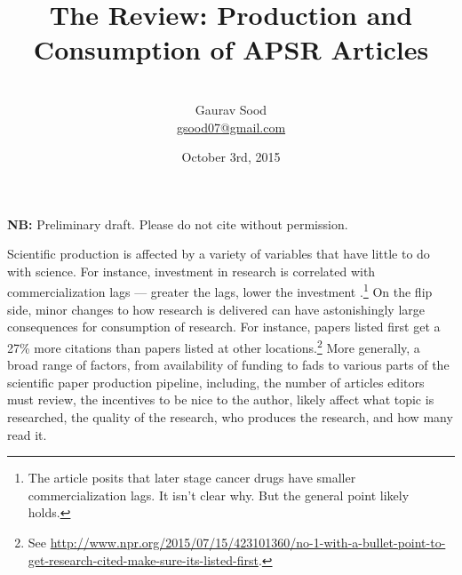 \documentclass[12pt]{article}
\begin{document}
\title{\vspace{-.5cm}\normalsize{The Review: Production and Consumption of APSR Articles}}
\author{\vspace{.2cm}\\\normalsize{Gaurav Sood}\\\href{mailto:gsood07@gmail.com}{\small{gsood07@gmail.com}}\vspace{.3cm}\\}
\date{\normalsize{October 3rd, 2015}}
\maketitle
\begin{center}
\textbf{NB:} Preliminary draft. Please do not cite without permission.
\end{center}
\vspace{.4cm}
\doublespacing

Scientific production is affected by a variety of variables that have little to do with science. For instance, investment in research is correlated with commercialization lags --- greater the lags, lower the investment \citep{budish2013firms}.\footnote{The article posits that later stage cancer drugs have smaller commercialization lags. It isn't clear why. But the general point likely holds.} On the flip side, minor changes to how research is delivered can have astonishingly large consequences for consumption of research. For instance, papers listed first get a 27\% more citations than papers listed at other locations.\footnote{ See \href{http://www.npr.org/2015/07/15/423101360/no-1-with-a-bullet-point-to-get-research-cited-make-sure-its-listed-first}{http://www.npr.org/2015/07/15/423101360/no-1-with-a-bullet-point-to-get-research-cited-make-sure-its-listed-first}.} More generally, a broad range of factors, from availability of funding to fads to various parts of the scientific paper production pipeline, including, the number of articles editors must review, the incentives to be nice to the author, likely affect what topic is researched, the quality of the research, who produces the research, and how many read it. 
\end{document}
